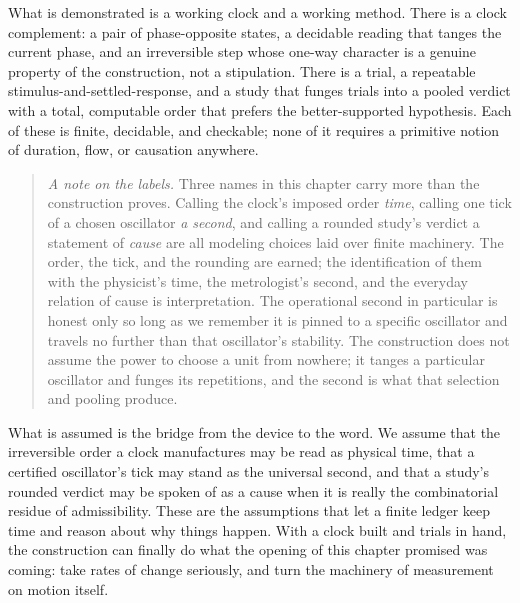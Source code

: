 What is demonstrated is a working clock and a working method. There is a clock complement: a pair of
phase-opposite states, a decidable reading that tanges the current phase, and an irreversible step
whose one-way character is a genuine property of the construction, not a stipulation. There is a trial,
a repeatable stimulus-and-settled-response, and a study that funges trials into a pooled verdict with a
total, computable order that prefers the better-supported hypothesis. Each of these is finite,
decidable, and checkable; none of it requires a primitive notion of duration, flow, or causation
anywhere.

\begin{quote}
\emph{A note on the labels.} Three names in this chapter carry more than the construction proves.
Calling the clock's imposed order \emph{time}, calling one tick of a chosen oscillator \emph{a second},
and calling a rounded study's verdict a statement of \emph{cause} are all modeling choices laid over
finite machinery. The order, the tick, and the rounding are earned; the identification of them with the
physicist's time, the metrologist's second, and the everyday relation of cause is interpretation. The
operational second in particular is honest only so long as we remember it is pinned to a specific
oscillator and travels no further than that oscillator's stability. The construction does not assume
the power to choose a unit from nowhere; it tanges a particular oscillator and funges its repetitions,
and the second is what that selection and pooling produce.
\end{quote}

What is assumed is the bridge from the device to the word. We assume that the irreversible order a
clock manufactures may be read as physical time, that a certified oscillator's tick may stand as the
universal second, and that a study's rounded verdict may be spoken of as a cause when it is really the
combinatorial residue of admissibility. These are the assumptions that let a finite ledger keep time
and reason about why things happen. With a clock built and trials in hand, the construction can finally
do what the opening of this chapter promised was coming: take rates of change seriously, and turn the
machinery of measurement on motion itself.
